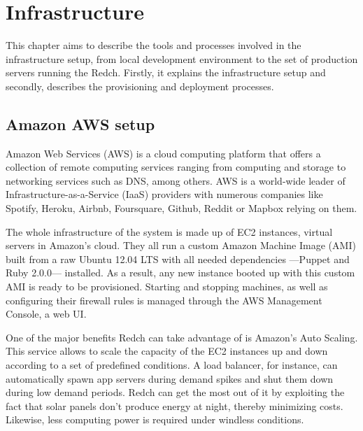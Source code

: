 \chapter{Infrastructure}

This chapter aims to describe the tools and processes involved in the infrastructure setup, from local development environment to the set of production servers running the Redch. Firstly, it explains the infrastructure setup and secondly, describes the provisioning and deployment processes.

\section{Amazon AWS setup}

Amazon Web Services (AWS) is a cloud computing platform that offers a collection of remote computing services ranging from computing and storage to networking services such as DNS, among others. AWS is a world-wide leader of Infrastructure-as-a-Service (IaaS) providers with numerous companies like Spotify, Heroku, Airbnb, Foursquare, Github, Reddit or Mapbox relying on them.

The whole infrastructure of the system is made up of EC2 instances, virtual servers in Amazon's cloud. They all run a custom Amazon Machine Image (AMI) built from a raw Ubuntu 12.04 LTS with all needed dependencies ---Puppet and Ruby 2.0.0--- installed. As a result, any new instance booted up with this custom AMI is ready to be provisioned. Starting and stopping machines, as well as configuring their firewall rules is managed through the AWS Management Console, a web UI.

One of the major benefits Redch can take advantage of is Amazon's Auto Scaling. This service allows to scale the capacity of the EC2 instances up and down according to a set of predefined conditions. A load balancer, for instance, can automatically spawn app servers during demand spikes and shut them down during low demand periods. Redch can get the most out of it by exploiting the fact that solar panels don't produce energy at night, thereby minimizing costs. Likewise, less computing power is required under windless conditions.

